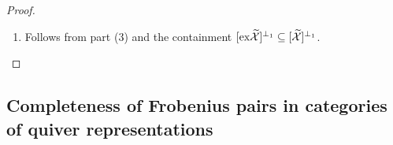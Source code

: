 \documentclass[10pt,reqno]{amsart}
\numberwithin{equation}{section}
\theoremstyle{remark}
\newcommand{\Ext}{\mathrm{Ext}}
\newcommand{\X}{\mathcal{X}}
\begin{document}
\begin{proof}
\begin{enumerate}[(1)]
Now from the proof of part (1), we know that we can obtain an exact sequence $K_\bullet \rightarrowtail L_\bullet \twoheadrightarrow W_\bullet$ where $L_\bullet \in \widetilde{\omega}^\wedge_m$ and $K_\bullet \in [\widetilde{\omega}^\wedge_m]^{\perp_1}$. Now form the following pullback diagram:
\[
\begin{tikzpicture}[description/.style={fill=white,inner sep=2pt}] 
\matrix (m) [matrix of math nodes, row sep=2.3em, column sep=2.3em, text height=1.25ex, text depth=0.25ex] 
{ 
K_\bullet & K_\bullet & {} \\
Q_\bullet & L_\bullet & Y_\bullet \\
E_\bullet & W_\bullet & Y_\bullet \\
}; 
\path[->] 
(m-2-1)-- node[pos=0.5] {\footnotesize$\mbox{\bf pb}$} (m-3-2) 
;
\path[>->]
(m-1-1) edge (m-2-1) (m-1-2) edge (m-2-2)
(m-2-1) edge (m-2-2)
(m-3-1) edge (m-3-2)
;
\path[->>]
(m-2-2) edge (m-2-3) edge (m-3-2)
(m-2-1) edge (m-3-1)
(m-3-2) edge (m-3-3)
;
\path[-,font=\scriptsize]
(m-1-1) edge [double, thick, double distance=2pt] (m-1-2)
(m-2-3) edge [double, thick, double distance=2pt] (m-3-3)
;
\end{tikzpicture}
\]
The proof will conclude after showing that $Q_\bullet \in [\widetilde{\omega}^\wedge_m]^{\perp_1}$, for which it suffices to note that $E_\bullet \in [\widetilde{\omega}^\wedge_m]^{\perp_1}$. For, let $L'_\bullet \in \widetilde{\omega}^\wedge_m = \widetilde{\omega^\wedge_m}$. In particular, $L'_\bullet$ is exact. On the other hand, since $E_\bullet$ has injective components, every short exact sequence in $\Ext^1(L'_\bullet, E_\bullet)$ splits at each degree. Then by \cite[Lem. 2.1]{GillespieFlat} we have that $\Ext^1(L'_\bullet, E_\bullet) \cong H_{-1}(\mathcal{H}{\rm om}(L'_\bullet,E_\bullet))$. Note also that $\mathcal{H}{\rm om}(L'_\bullet,E_\bullet)$ is exact since $L'_\bullet$ is exact and $E_\bullet$ is dg-injective. Hence, $\Ext^1(L'_\bullet, E_\bullet) = 0$. 
 
\item Follows from part (3) and the containment $[{\rm ex}\widetilde{\X}]^{\perp_1} \subseteq [\widetilde{\X}]^{\perp_1}$. 
\end{enumerate}
\end{proof}



\subsection*{Completeness of Frobenius pairs in categories of quiver representations}
\end{document}
